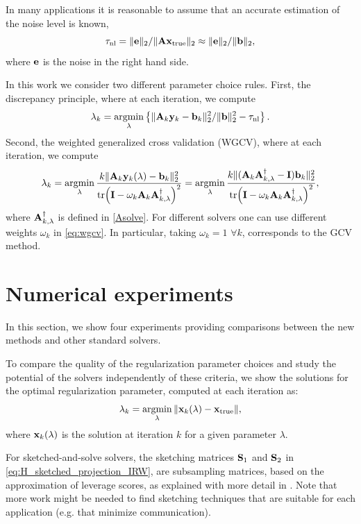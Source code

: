 \documentclass[11pt]{article}
\numberwithin{equation}{section}
\newcommand{\trace} [1]  {{\rm tr\!}\left( #1 \right)}  %
\newcommand{\bfA}{{\bf A}}
\newcommand{\bfI}{{\bf I}}
\newcommand{\bfS}{{\bf S}}
\newcommand{\bfb}{{\bf b}}
\newcommand{\bfe}{{\bf e}}
\newcommand{\bfx}{{\bf x}}
\newcommand{\bfy}{{\bf y}}
\DeclareMathOperator*{\argmin}{argmin}
\begin{document}
In many applications it is reasonable to assume that an accurate estimation of the noise level is known, 
\begin{equation}\label{eq:noise_level}
\tau_\text{nl} = \|\bfe\|_2 / \|\bfA \bfx_{\rm true}\|_2 \approx  \|\bfe\|_2 / \|\bfb\|_2,    
\end{equation} 
where $\bfe$ is the noise in the right hand side. 

In this work we consider two different parameter choice rules. First, the discrepancy principle, where at each iteration, we compute 
\[
\lambda_k = \argmin_{\lambda} \left\{\|\bfA_k\bfy_k-\bfb_k\|_2^2 / \|\bfb\|_2^2 -\tau_\text{nl} \right\}.
\] 
Second, the weighted generalized cross validation (WGCV), where at each iteration, we compute 
\begin{equation}\label{eq:wgcv}
\lambda_k = \argmin_{\lambda} \frac{k\|\bfA_k \bfy_k(\lambda)- \bfb_k\|_2^2}{\trace{\bfI-\omega_k \bfA_k \bfA_{k,\lambda}^{\dagger} }^2} = \argmin_{\lambda} \frac{k\|(\bfA_k \bfA_{k,\lambda}^{\dagger}- \bfI) \bfb_k\|_2^2}{\trace{\bfI-\omega_k \bfA_k \bfA_{k,\lambda}^{\dagger} }^2},
\end{equation}
where $\bfA_{k,\lambda}^{\dagger}$ is defined in \eqref{Asolve}.
For different solvers one can use different weights $\omega_k$ in \eqref{eq:wgcv}. In particular, taking $\omega_k=1$ $\forall k$, corresponds to the GCV method. 

\section{Numerical experiments}\label{sec:numerics}
In this section, we show four experiments providing comparisons between the new methods and other standard solvers.

To compare the quality of the regularization parameter choices and study the potential of the solvers independently of these  criteria, we show the solutions for the optimal regularization parameter, computed at each iteration as:
\begin{equation} \label{para:opt}
\lambda_k=\argmin_{\lambda}\|\bfx_k(\lambda)-\bfx_{\text{true}}\|,
\end{equation}
where $\bfx_k(\lambda)$ is the solution at iteration $k$ for a given parameter $\lambda$.

For sketched-and-solve solvers, the sketching matrices $\bfS_1$ and $\bfS_2$ in \eqref{eq:H_sketched_projection_IRW}, are subsampling matrices, based on the approximation of leverage scores, as explained with more detail in \cite{Sabate2025rand}. Note that more work might be needed to find sketching techniques that are suitable for each application (e.g. that minimize communication).
\end{document}
